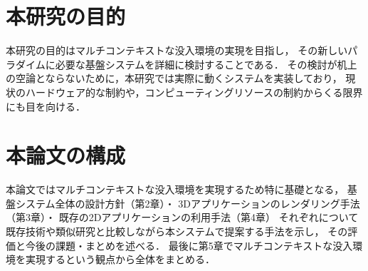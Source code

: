 \section{本研究の目的}

本研究の目的はマルチコンテキストな没入環境の実現を目指し，
その新しいパラダイムに必要な基盤システムを詳細に検討することである．
その検討が机上の空論とならないために，本研究では実際に動くシステムを実装しており，
現状のハードウェア的な制約や，コンピューティングリソースの制約からくる限界にも目を向ける．


\section{本論文の構成}

本論文ではマルチコンテキストな没入環境を実現するため特に基礎となる，
基盤システム全体の設計方針（第2章）・
3Dアプリケーションのレンダリング手法（第3章）・
既存の2Dアプリケーションの利用手法（第4章）
それぞれについて既存技術や類似研究と比較しながら本システムで提案する手法を示し，
その評価と今後の課題・まとめを述べる．
最後に第5章でマルチコンテキストな没入環境を実現するという観点から全体をまとめる．
